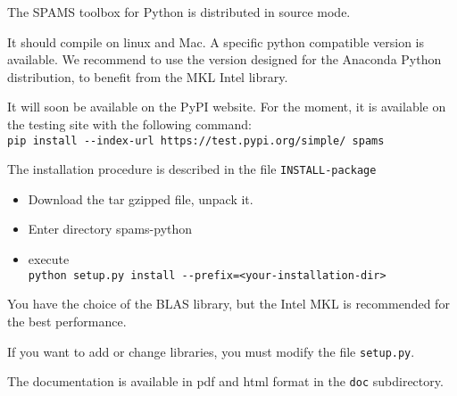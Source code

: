 The SPAMS toolbox for Python is distributed in source mode.

It should compile on linux and Mac. A specific python compatible version
is available. We recommend to use the version designed for the Anaconda
Python distribution, to benefit from the MKL Intel library.

It will soon be available on the PyPI website. For the moment, it is available
on the testing site with the following command: \\
  \verb;pip install --index-url https://test.pypi.org/simple/ spams;

The installation procedure is described in the file \verb=INSTALL-package=
\begin{itemize}
\item Download the tar gzipped file, unpack it.
\item Enter directory spams-python
\item execute \\
  \verb;python setup.py install --prefix=<your-installation-dir>;
\end{itemize}

You have the choice of the BLAS library, but the Intel
MKL is recommended for the best performance.

If you want to add or change libraries, you must modify
the file \verb=setup.py=.

The documentation is available in pdf and html format in the \verb=doc= subdirectory.
